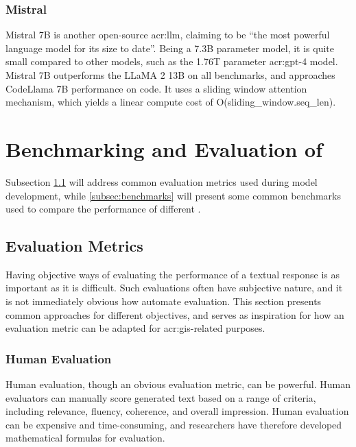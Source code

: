 \subsubsection{Mistral}

Mistral 7B \citep{aiMistral7B2023} is another open-source \acrshort{acr:llm}, claiming to be \enquote{the most powerful language model for its size to date}. Being a 7.3B parameter model, it is quite small compared to other models, such as the 1.76T parameter \acrshort{acr:gpt}-4 model. Mistral 7B outperforms the LLaMA 2 13B on all benchmarks, and approaches CodeLlama 7B performance on code. It uses a sliding window attention mechanism, which yields a linear compute cost of O(sliding\_window.seq\_len).

\section[Benchmarking and Evaluation of LLMs]{Benchmarking and Evaluation of }\label{sec:benchmarking-and-evaluation}

Subsection \ref{subsec:evaluation-metrics} will address common evaluation metrics used during model development, while \autoref{subsec:benchmarks} will present some common benchmarks used to compare the performance of different .

\subsection{Evaluation Metrics}\label{subsec:evaluation-metrics}

Having objective ways of evaluating the performance of a textual response is as important as it is difficult. Such evaluations often have subjective nature, and it is not immediately obvious how automate evaluation. This section presents common approaches for different objectives, and serves as inspiration for how an evaluation metric can be adapted for \acrshort{acr:gis}-related purposes.

\subsubsection{Human Evaluation}

Human evaluation, though an obvious evaluation metric, can be powerful. Human evaluators can manually score generated text based on a range of criteria, including relevance, fluency, coherence, and overall impression. Human evaluation can be expensive and time-consuming, and researchers have therefore developed mathematical formulas for evaluation.

